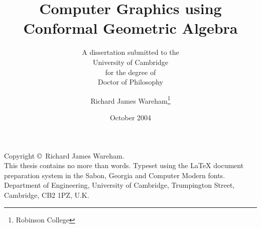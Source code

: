 \documentclass[a4paper,oneside,12pt,sabonnumbers]{RJWThesis}
\date{October 2004}
\begin{document}
\begin{frontmatter}
\renewcommand{\baselinestretch}{1.2}\selectfont
\title{Computer Graphics using Conformal Geometric Algebra}
\subtitle{A dissertation submitted to the\\{\sc University of 
    Cambridge}\\for the degree of\\{\sc Doctor of Philosophy}}
\author{Richard James Wareham\thanks{Robinson College}}
\maketitle
\cleardoublepage

\vspace*{0.2\textheight}
\noindent Copyright \copyright \number\year\ Richard James Wareham.
\vspace*{1em}\\
\noindent This thesis contains no more than  words.
\vfill
\noindent Typeset using the \LaTeX{} document preparation system
in the Sabon, Georgia and Computer Modern fonts.
\vfill
{}\newline
Department of Engineering,\newline
University of Cambridge,\newline
Trumpington Street,\newline
Cambridge, CB2 1PZ, U.K.
\cleardoublepage

\dedication{To my parents and\\ all those that helped\\ me get here}

\tableofcontents
\listoffigures
\listoftables
\end{frontmatter}

\begin{mainmatter}
\renewcommand{\baselinestretch}{1.75}\selectfont










\end{mainmatter}


\begin{backmatter}

\end{backmatter}
\end{document}
